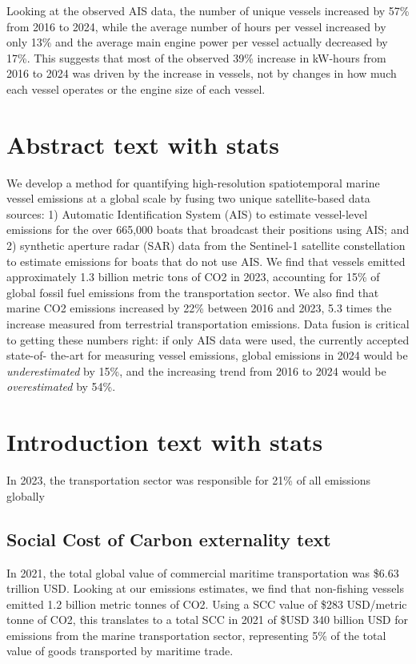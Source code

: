 \documentclass[
  letterpaper,
  DIV=11,
  numbers=noendperiod]{scrartcl}
\begin{document}
Looking at the observed AIS data, the number of unique vessels increased
by 57\% from 2016 to 2024, while the average number of hours per vessel
increased by only 13\% and the average main engine power per vessel
actually decreased by 17\%. This suggests that most of the observed 39\%
increase in kW-hours from 2016 to 2024 was driven by the increase in
vessels, not by changes in how much each vessel operates or the engine
size of each vessel.

\section{Abstract text with stats}\label{abstract-text-with-stats}

We develop a method for quantifying high-resolution spatiotemporal
marine vessel emissions at a global scale by fusing two unique
satellite-based data sources: 1) Automatic Identification System (AIS)
to estimate vessel-level emissions for the over 665,000 boats that
broadcast their positions using AIS; and 2) synthetic aperture radar
(SAR) data from the Sentinel-1 satellite constellation to estimate
emissions for boats that do not use AIS. We find that vessels emitted
approximately 1.3 billion metric tons of CO2 in 2023, accounting for
15\% of global fossil fuel emissions from the transportation sector. We
also find that marine CO2 emissions increased by 22\% between 2016 and
2023, 5.3 times the increase measured from terrestrial transportation
emissions. Data fusion is critical to getting these numbers right: if
only AIS data were used, the currently accepted state-of- the-art for
measuring vessel emissions, global emissions in 2024 would be
\emph{underestimated} by 15\%, and the increasing trend from 2016 to
2024 would be \emph{overestimated} by 54\%.

\section{Introduction text with
stats}\label{introduction-text-with-stats}

In 2023, the transportation sector was responsible for 21\% of all
emissions globally

\subsection{Social Cost of Carbon externality
text}\label{social-cost-of-carbon-externality-text}

In 2021, the total global value of commercial maritime transportation
was \$6.63 trillion USD. Looking at our emissions estimates, we find
that non-fishing vessels emitted 1.2 billion metric tonnes of CO2. Using
a SCC value of \$283 USD/metric tonne of CO2, this translates to a total
SCC in 2021 of \$USD 340 billion USD for emissions from the marine
transportation sector, representing 5\% of the total value of goods
transported by maritime trade.
\end{document}
